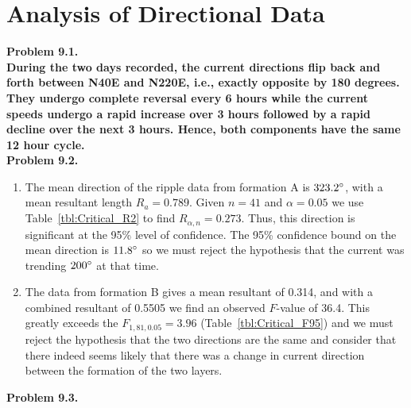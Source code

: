 \section{Analysis of Directional Data}

\noindent
\bf{Problem 9.1.} \\

During the two days recorded, the current directions flip back and forth between N40E and N220E, i.e.,
exactly opposite by 180 degrees.  They undergo complete reversal every 6 hours while the current speeds undergo
a rapid increase over 3 hours followed by a rapid decline over the next 3 hours.  Hence, both components have the
same 12 hour cycle. \\

\noindent
\bf{Problem 9.2.} \\

\begin{enumerate}[label=\alph*)]
\item  The mean direction of the ripple data from formation A is $323.2^{\circ}$,
with a mean resultant length $R_a = 0.789$.  Given $n = 41$ and $\alpha = 0.05$ we use Table~\ref{tbl:Critical_R2}
to find $R_{\alpha,n} = 0.273$.  Thus, this direction is significant at the 95\% level of confidence.
The 95\% confidence bound on the mean direction is $11.8^{\circ}$ so we must reject the hypothesis that the current was
trending $200^{\circ}$ at that time.
\item The data from formation B gives a mean resultant of 0.314, and with a combined resultant of 0.5505 we find
an observed $F$-value of 36.4.  This greatly exceeds the $F_{1,81,0.05} = 3.96$ (Table~\ref{tbl:Critical_F95}) and
we must reject the hypothesis that the two directions are the same and consider that there indeed seems likely that there
was a change in current direction between the formation of the two layers.
\end{enumerate}


\noindent
\bf{Problem 9.3.} \\

